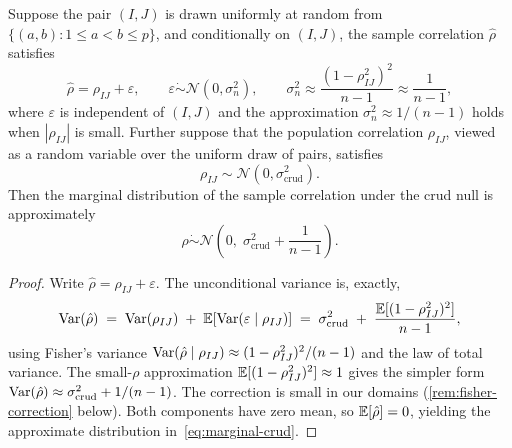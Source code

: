\begin{theorem}\label{thm:parametric-crud}
Suppose the pair $(I,J)$ is drawn uniformly at random from $\{(a,b): 1\le a<b\le p\}$, and conditionally on $(I,J)$, the sample correlation $\hat\rho$ satisfies
\begin{equation}\label{eq:sample-corr-approx}
\hat\rho = \rho_{IJ} + \varepsilon, \qquad \varepsilon\mathrel{\dot{\sim}}\mathcal{N}(0, \sigma_n^2), \qquad \sigma_n^2 \approx \frac{(1-\rho_{IJ}^2)^2}{n-1}\approx\frac{1}{n-1},
\end{equation}
where $\varepsilon$ is independent of $(I,J)$ and the approximation $\sigma_n^2\approx 1/(n-1)$ holds when $|\rho_{IJ}|$ is small.
Further suppose that the population correlation $\rho_{IJ}$, viewed as a random variable over the uniform draw of pairs, satisfies
\begin{equation}\label{eq:crud-null-dist}
\rho_{IJ} \sim \mathcal{N}(0, \sigma_{\mathrm{crud}}^2).
\end{equation}
Then the marginal distribution of the sample correlation under the crud null is approximately
\begin{equation}\label{eq:marginal-crud}
\hat\rho \mathrel{\dot{\sim}} \mathcal{N}\!\left(0,\; \sigma_{\mathrm{crud}}^2 + \frac{1}{n-1}\right).
\end{equation}
\end{theorem}

\begin{proof}
Write $\hat\rho = \rho_{IJ} + \varepsilon$. The unconditional variance is, exactly,
\begin{equation}\label{eq:exact-uncond-var}
\operatorname{Var}(\hat\rho) \;=\; \operatorname{Var}(\rho_{IJ}) \;+\; \mathbb{E}[\operatorname{Var}(\varepsilon\mid\rho_{IJ})] \;=\; \sigma_{\mathrm{crud}}^2 \;+\; \frac{\mathbb{E}[(1-\rho_{IJ}^2)^2]}{n-1},
\end{equation}
using Fisher's variance $\operatorname{Var}(\hat\rho\mid\rho_{IJ})\approx (1-\rho_{IJ}^2)^2/(n-1)$ and the law of total variance. The small-$\rho$ approximation $\mathbb{E}[(1-\rho_{IJ}^2)^2]\approx 1$ gives the simpler form $\operatorname{Var}(\hat\rho)\approx \sigma_{\mathrm{crud}}^2 + 1/(n-1)$. The correction is small in our domains (\ref{rem:fisher-correction} below). Both components have zero mean, so $\mathbb{E}[\hat\rho]=0$, yielding the approximate distribution in~\eqref{eq:marginal-crud}.
\end{proof}

